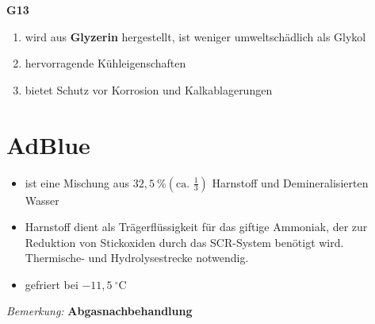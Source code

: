 \textbf{G13}

\begin{enumerate}
\item
  wird aus \textbf{Glyzerin} hergestellt, ist weniger umweltschädlich
  als Glykol
\item
  hervorragende Kühleigenschaften
\item
  bietet Schutz vor Korrosion und Kalkablagerungen
\end{enumerate}

\section{AdBlue}\label{adblue}

\begin{itemize}
\item
  ist eine Mischung aus $32,5~\% (\text{ca. } \frac{1}{3})$ Harnstoff
  und Demineralisierten Wasser
\item
  Harnstoff dient als Trägerflüssigkeit für das giftige Ammoniak, der
  zur Reduktion von Stickoxiden durch das SCR-System benötigt wird.
  Thermische- und Hydrolysestrecke notwendig.
\item
  gefriert bei $- 11,5~^\circ\text{C}$
\end{itemize}

\emph{Bemerkung:} \textbf{Abgasnachbehandlung}

